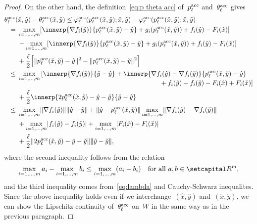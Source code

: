 \documentclass[../main]{subfiles}
\begin{document}
\begin{proof}
    On the other hand, the definition~\cref{eq:p theta acc} of~$p^{\mathrm{acc}}_\ell$ and~$\theta^{\mathrm{acc}}_\ell$ gives
    \begin{align}
        \MoveEqLeft \theta^\acc_\ell(\hat{x}, \hat{y}) - \theta^\acc_\ell(\check{x}, \check{y}) \le \varphi^\acc_\ell(p^\acc_\ell(\check{x}, \check{y}); \hat{x}, \hat{y}) - \varphi^\acc_\ell(p^\acc_\ell(\check{x}, \check{y}); \check{x}, \check{y})  \\
        ={} & \max_{i = 1, \dots, m} [\innerp{\nabla f_i(\hat{y})}{p^\acc_\ell(\check{x}, \check{y}) - \hat{y}} + g_i(p^\acc_\ell(\check{x}, \check{y})) + f_i(\hat{y}) - F_i(\hat{x})] \\
            &- \max_{i = 1, \dots, m} [\innerp{\nabla f_i(\check{y})}{p^\acc_\ell(\check{x}, \check{y}) - \check{y}} + g_i(p^\acc_\ell(\check{x}, \check{y})) + f_i(\check{y}) - F_i(\check{x})] \\
           &+ \frac{\ell}{2} \Big[ \norm{p^\acc_\ell(\check{x}, \check{y}) - \hat{y}}^2 - \norm{p^\acc_\ell(\check{x}, \check{y}) - \check{y}}^2 \Big] \\
       \le{} & \max_{i = 1, \dots, m} 
       \begin{multlined}[t]
           [ \innerp{\nabla f_i(\check{y})}{\check{y} - \hat{y}} + \innerp{\nabla f_i(\hat{y}) - \nabla f_i(\check{y})}{p^\acc_\ell(\check{x}, \check{y}) - \hat{y}} \\
           + f_i(\hat{y}) - f_i(\check{y}) - F_i(\hat{x}) + F_i(\check{x}) ]
       \end{multlined} \\
             &+ \frac{\ell}{2} \innerp{2 p^\acc_\ell(\check{x}, \check{y}) - \hat{y} - \check{y}}{\check{y} - \hat{y}} \\
       \le{} & \max_{i = 1, \dots, m} \norm{\nabla f_i(\check{y})} \norm{\hat{y} - \check{y}} + \norm{\hat{y} - p^\acc_\ell(\check{x}, \check{y})} \max_{i = 1, \dots, m} \norm{\nabla f_i(\hat{y}) - \nabla f_i(\check{y})} \\
             &+ \max_{i = 1, \dots, m} \abs{f_i(\hat{y}) - f_i(\check{y})} + \max_{i = 1, \dots, m} \abs{F_i(\hat{x}) - F_i(\check{x})} \\
             &+ \frac{\ell}{2} \norm{2 p^\acc_\ell(\check{x}, \check{y}) - \hat{y} - \check{y}} \norm{\hat{y} - \check{y}}
   ,\end{align}
   where the second inequality follows from the relation
   \[
       \max_{i = 1, \dots, m} a_i - \max_{i = 1, \dots, m} b_i \le \max_{i = 1, \dots, m} (a_i - b_i) \forallcondition{a, b \in \setR^m}
   ,\] and the third inequality comes from~\cref{eq:lambda} and Cauchy-Schwarz inequalites.
   Since the above inequality holds even if we interchange~$(\hat{x}, \hat{y})$ and~$(\check{x}, \check{y})$, we can show the Lipschitz continuity of~$\theta^{\mathrm{acc}}_\ell$ on~$W$ in the same way as in the previous paragraph.
     \end{proof}
\end{document}
